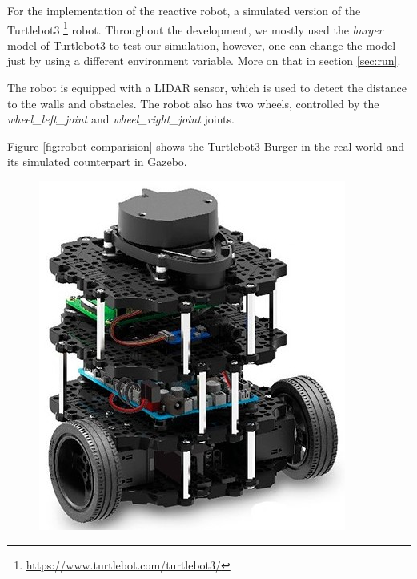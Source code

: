 \documentclass[conference]{IEEEtran}
\begin{document}
For the implementation of the reactive robot, a simulated version of the Turtlebot3 \footnote{\url{https://www.turtlebot.com/turtlebot3/}}
robot. Throughout the development, we mostly used the \emph{burger} model of Turtlebot3 to test our simulation, however, one can change the model
just by using a different environment variable. More on that in section \ref{sec:run}.

The robot is equipped with a LIDAR sensor, which is used to detect the distance to the walls and obstacles.
The robot also has two wheels, controlled by the \emph{wheel\_left\_joint} and \emph{wheel\_right\_joint} joints.

Figure \ref{fig:robot-comparision} shows the Turtlebot3 Burger in the real world and its simulated counterpart
in Gazebo.

\begin{figure}[h]
    \centering
    \begin{minipage}{.4\columnwidth}
        \centering
        \includegraphics[width=\textwidth]{images/turtlebot3-burger.jpg}
    \end{minipage}%
    \begin{minipage}{.4\columnwidth}
        \centering

\end{minipage}
\end{figure}
\end{document}
